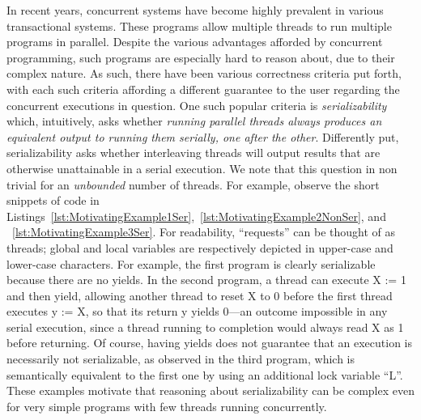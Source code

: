 In recent years, concurrent systems have become highly prevalent in various transactional systems. These programs allow multiple threads to run multiple programs in parallel.
Despite the various advantages afforded by concurrent programming, such programs are especially hard to reason about, due to their complex nature.
%
As such, there have been various correctness criteria put forth, with each such criteria affording a different guarantee to the user regarding the concurrent executions in question.
One such popular criteria is \textit{serializability} which, intuitively, asks whether \textit{running parallel threads always produces an equivalent output to running them serially, one after the other}. Differently put, serializability asks whether interleaving threads will output results that are otherwise unattainable in a serial execution.
%
We note that this question in non trivial for an \textit{unbounded} number of threads. For example, observe the short snippets of code in Listings~\ref{lst:MotivatingExample1Ser},~\ref{lst:MotivatingExample2NonSer}, and ~\ref{lst:MotivatingExample3Ser}. For readability, ``requests'' can be thought of as threads; global and local variables are respectively depicted in upper-case and lower-case characters.
%
For example, the first program is clearly serializable because there are no yields. In the second program, a thread can execute X := 1 and then yield, allowing another thread to reset X to 0 before the first thread executes y := X, so that its return y yields 0—an outcome impossible in any serial execution, since a thread running to completion would always read X as 1 before returning.
Of course, having yields does not guarantee that an execution is necessarily not serializable, as observed in the third program, which is semantically equivalent to the first one by using an additional lock variable ``L''.
These examples motivate that reasoning about serializability can be complex even for very simple programs with few threads running concurrently.
%


